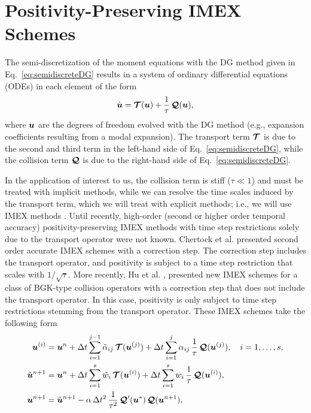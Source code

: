 \section{Positivity-Preserving IMEX Schemes}
\label{sec:imex}

The semi-discretization of the moment equations with the DG method given in Eq.~\eqref{eq:semidiscreteDG} results in a system of ordinary differential equations (ODEs) in each element of the form
\begin{equation}
  \dot{\boldsymbol{u}}
  =\boldsymbol{\mathcal{T}}(\boldsymbol{u})+\frac{1}{\tau}\,\boldsymbol{\mathcal{Q}}(\boldsymbol{u}),
\end{equation}
where $\boldsymbol{u}$ are the degrees of freedom evolved with the DG method (e.g., expansion coefficients resulting from a modal expansion).  
The transport term $\boldsymbol{\mathcal{T}}$ is due to the second and third term in the left-hand side of Eq.~\eqref{eq:semidiscreteDG}, while the collision term $\boldsymbol{\mathcal{Q}}$ is due to the right-hand side of Eq.~\eqref{eq:semidiscreteDG}.  

In the application of interest to us, the collision term is stiff ($\tau\ll1$) and must be treated with implicit methods, while we can resolve the time scales induced by the transport term, which we will treat with explicit methods; i.e., we will use IMEX methods \cite{pareschiRusso_2005}.  
Until recently, high-order (second or higher order temporal accuracy) positivity-preserving IMEX methods with time step restrictions solely due to the transport operator were not known.  
Chertock et al. \cite{chertock_etal_2015} presented second order accurate IMEX schemes with a correction step.  
The correction step includes the transport operator, and positivity is subject to a time step restriction that scales with $1/\sqrt{\tau}$.  
More recently, Hu et al. \cite{hu_etal_2017}, presented new IMEX schemes for a class of BGK-type collision operators with a correction step that does not include the transport operator.  
In this case, positivity is only subject to time step restrictions stemming from the transport operator.  
These IMEX schemes take the following form \cite{hu_etal_2017}
\begin{align}
  \boldsymbol{u}^{(i)}
  &=\boldsymbol{u}^{n}
  +\Delta t\sum_{i=1}^{j-1}\tilde{\alpha}_{ij}\,\boldsymbol{\mathcal{T}}(\boldsymbol{u}^{(j)})
  +\Delta t\sum_{i=1}^{j}\alpha_{ij}\,\frac{1}{\tau}\,\boldsymbol{\mathcal{Q}}(\boldsymbol{u}^{(j)}),
  \quad i=1,\ldots,s, \\
  \tilde{\boldsymbol{u}}^{n+1}
  &=\boldsymbol{u}^{n}
  +\Delta t\sum_{i=1}^{s}\tilde{w}_{i}\,\boldsymbol{\mathcal{T}}(\boldsymbol{u}^{(i)})
  +\Delta t\sum_{i=1}^{s}w_{i}\,\frac{1}{\tau}\,\boldsymbol{\mathcal{Q}}(\boldsymbol{u}^{(i)}), \\
  \boldsymbol{u}^{n+1}
  &=\tilde{\boldsymbol{u}}^{n+1}-\alpha\,\Delta t^{2}\,\frac{1}{\tau^{2}}\,\boldsymbol{\mathcal{Q}}'(\boldsymbol{u}^{*})\,\boldsymbol{\mathcal{Q}}(\boldsymbol{u}^{n+1}), 
\end{align}